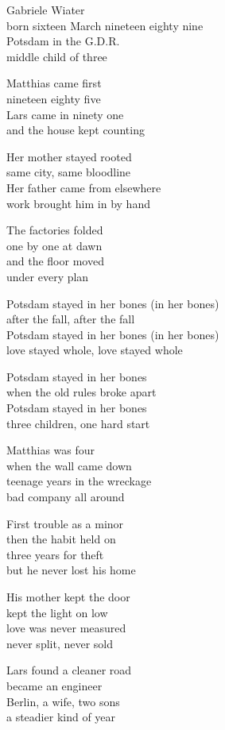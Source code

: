 \begin{lyrics}
Gabriele Wiater\\
born sixteen March nineteen eighty nine\\
Potsdam in the G.D.R.\\
middle child of three

Matthias came first\\
nineteen eighty five\\
Lars came in ninety one\\
and the house kept counting

Her mother stayed rooted\\
same city, same bloodline\\
Her father came from elsewhere\\
work brought him in by hand

The factories folded\\
one by one at dawn\\
and the floor moved\\
under every plan

Potsdam stayed in her bones (in her bones)\\
after the fall, after the fall\\
Potsdam stayed in her bones (in her bones)\\
love stayed whole, love stayed whole

Potsdam stayed in her bones\\
when the old rules broke apart\\
Potsdam stayed in her bones\\
three children, one hard start

Matthias was four\\
when the wall came down\\
teenage years in the wreckage\\
bad company all around

First trouble as a minor\\
then the habit held on\\
three years for theft\\
but he never lost his home

His mother kept the door\\
kept the light on low\\
love was never measured\\
never split, never sold

Lars found a cleaner road\\
became an engineer\\
Berlin, a wife, two sons\\
a steadier kind of year


\end{lyrics}
